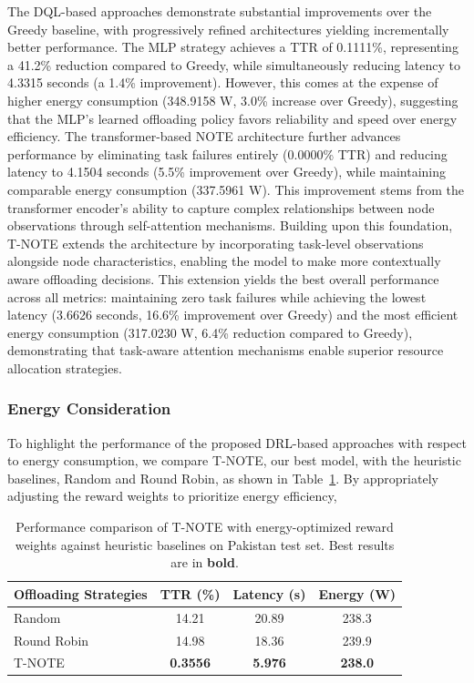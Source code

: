 \documentclass[preprint,3p,authoryear]{elsarticle}
\begin{document}
The DQL-based approaches demonstrate substantial improvements over the Greedy baseline, with progressively refined architectures yielding incrementally better performance. The MLP strategy achieves a TTR of 0.1111\%, representing a 41.2\% reduction compared to Greedy, while simultaneously reducing latency to 4.3315 seconds (a 1.4\% improvement). However, this comes at the expense of higher energy consumption (348.9158 W, 3.0\% increase over Greedy), suggesting that the MLP's learned offloading policy favors reliability and speed over energy efficiency. The transformer-based NOTE architecture further advances performance by eliminating task failures entirely (0.0000\% TTR) and reducing latency to 4.1504 seconds (5.5\% improvement over Greedy), while maintaining comparable energy consumption (337.5961 W). This improvement stems from the transformer encoder's ability to capture complex relationships between node observations through self-attention mechanisms. Building upon this foundation, T-NOTE extends the architecture by incorporating task-level observations alongside node characteristics, enabling the model to make more contextually aware offloading decisions. This extension yields the best overall performance across all metrics: maintaining zero task failures while achieving the lowest latency (3.6626 seconds, 16.6\% improvement over Greedy) and the most efficient energy consumption (317.0230 W, 6.4\% reduction compared to Greedy), demonstrating that task-aware attention mechanisms enable superior resource allocation strategies.

\subsubsection{Energy Consideration}\label{sec:energy_consideration}

To highlight the performance of the proposed DRL-based approaches with respect to energy consumption, we compare T-NOTE, our best model, with the heuristic baselines, Random and Round Robin, as shown in Table~\ref{tab:energy_comparison}. By appropriately adjusting the reward weights to prioritize energy efficiency, 
\begin{table}[htbp]
\centering

\begin{tabular}{lccc}
\textbf{Offloading Strategies} & \textbf{TTR (\%)} & \textbf{Latency (s)} & \textbf{Energy (W)} \\
\hline
Random 
 & 14.21
 & 20.89
 & 238.3 \\
 
Round Robin 
 & 14.98
 & 18.36
 & 239.9 \\
 
T-NOTE 
 & \textbf{0.3556} 
 & \textbf{5.976} 
 & \textbf{238.0} \\

\end{tabular}

\caption{Performance comparison of T-NOTE with energy-optimized reward weights against heuristic baselines on Pakistan test set. Best results are in \textbf{bold}.}
\label{tab:energy_comparison}
\end{table}
\end{document}
